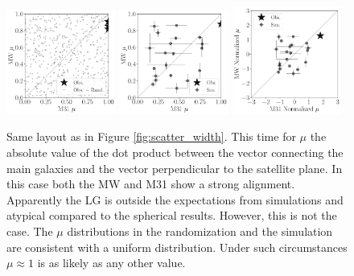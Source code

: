 \documentclass[a4paper,fleqn,usenatbib]{mnras}
\begin{document}
\begin{figure}
\centering
\includegraphics[width=0.32\textwidth]{scatter_random_ranked_mu.pdf}
\includegraphics[width=0.32\textwidth]{scatter_ranked_mu.pdf}
\includegraphics[width=0.32\textwidth]{scatter_norm_ranked_mu.pdf}
\caption{Same layout as in Figure \ref{fig:scatter_width}. 
This time for $\mu$ the absolute value of the dot product between the
vector connecting the main galaxies and the vector perpendicular to
the satellite plane.
In this case both the MW and M31 show a strong alignment.
Apparently the LG is outside the expectations from
simulations and atypical compared to the spherical results. 
However, this is not the case. The $\mu$ distributions in the
randomization and the simulation are consistent with a uniform
distribution.
Under such circumstances $\mu\approx 1$ is as likely as
any other value.
\label{fig:scatter_mu}}
\end{figure}
\end{document}
